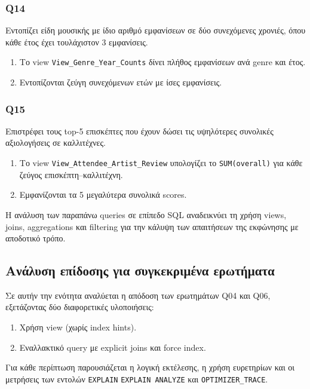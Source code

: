 \documentclass[13pt]{extarticle}
\begin{document}
\subsubsection{Q14}

Εντοπίζει είδη μουσικής με ίδιο αριθμό εμφανίσεων σε δύο συνεχόμενες χρονιές, όπου κάθε έτος έχει τουλάχιστον 3 εμφανίσεις.

\begin{enumerate}
    \item Το view \texttt{View\_Genre\_Year\_Counts} δίνει πλήθος εμφανίσεων ανά genre και έτος.
    \item Εντοπίζονται ζεύγη συνεχόμενων ετών με ίσες εμφανίσεις.
\end{enumerate}

\subsubsection{Q15}

Επιστρέφει τους top-5 επισκέπτες που έχουν δώσει τις υψηλότερες συνολικές αξιολογήσεις σε καλλιτέχνες.

\begin{enumerate}
    \item Το view \texttt{View\_Attendee\_Artist\_Review} υπολογίζει το \texttt{SUM(overall)} για κάθε ζεύγος επισκέπτη–καλλιτέχνη.
    \item Εμφανίζονται τα 5 μεγαλύτερα συνολικά scores.
\end{enumerate}

\vspace{0.5cm}
Η ανάλυση των παραπάνω queries σε επίπεδο SQL αναδεικνύει τη χρήση views, joins, aggregations και filtering για την κάλυψη των απαιτήσεων της εκφώνησης με αποδοτικό τρόπο.

\subsection{Ανάλυση επίδοσης για συγκεκριμένα ερωτήματα}

Σε αυτήν την ενότητα αναλύεται η απόδοση των ερωτημάτων Q04 και Q06, εξετάζοντας δύο διαφορετικές υλοποιήσεις:
\begin{enumerate}
    \item Χρήση view (χωρίς index hints).
    \item Εναλλακτικό query με explicit joins και force index.
\end{enumerate}

Για κάθε περίπτωση παρουσιάζεται η λογική εκτέλεσης, η χρήση ευρετηρίων και οι μετρήσεις των εντολών \texttt{EXPLAIN} \texttt{EXPLAIN ANALYZE} και \texttt{OPTIMIZER\_TRACE}.\\
\end{document}
